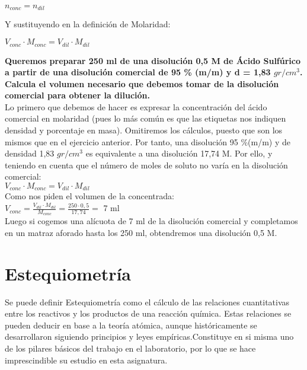 \begin{center}
	$n_{conc}=n_{dil}$
\end{center}

Y sustituyendo en la definición de Molaridad:\\

\begin{center}
	$V_{conc}\cdot M_{conc}=V_{dil}\cdot M_{dil}$
\end{center}

\begin{exercise}
	\textbf{Queremos preparar 250 ml de una disolución 0,5 M de Ácido Sulfúrico a partir de una disolución comercial de 95 \% (m/m) y d = 1,83 $gr/cm^3$. Calcula el volumen necesario que debemos tomar de la disolución comercial para obtener la dilución.}\\
	
	Lo primero que debemos de hacer es expresar la concentración del ácido comercial en molaridad (pues lo más común es que las etiquetas nos indiquen densidad y porcentaje en masa). Omitiremos los cálculos, puesto que son los mismos que en el ejercicio anterior. Por tanto, una disolución 95 \%(m/m) y de densidad 1,83 $gr/cm^3$ es equivalente a una disolución 17,74 M. Por ello, y teniendo en cuenta que el número de moles de soluto no varía en la disolución comercial:\\
	
	$V_{conc}\cdot M_{conc}=V_{dil}\cdot M_{dil}$\\
	
	Como nos piden el volumen de la concentrada:\\
	
	$V_{conc}=\frac{V_{dil}\cdot M_{dil}}{M_{conc}}= \frac{250\cdot 0,5}{17,74}=$ 7 ml\\
		
	Luego si cogemos una alícuota de 7 ml de la disolución comercial y completamos en un matraz aforado hasta los 250 ml, obtendremos una disolución 0,5 M.
	
\end{exercise}

\section{Estequiometría}

Se puede definir Estequiometría como el cálculo de las relaciones cuantitativas entre los reactivos y los productos de una reacción química. Estas relaciones se pueden deducir en base a la teoría atómica, aunque históricamente se desarrollaron siguiendo principios y leyes empíricas.Constituye en si misma uno de los pilares básicos del trabajo en el laboratorio, por lo que se hace imprescindible su estudio en esta asignatura.

